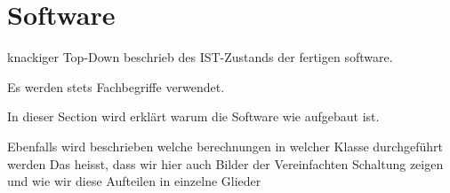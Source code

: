 \section{Software} \label{sec:software}

knackiger Top-Down beschrieb des IST-Zustands der fertigen software. 

Es werden stets Fachbegriffe verwendet. 


In dieser Section wird erklärt warum die Software wie aufgebaut ist.

Ebenfalls wird beschrieben welche berechnungen in welcher Klasse durchgeführt werden
Das heisst, dass wir hier auch Bilder der Vereinfachten Schaltung zeigen und wie wir diese Aufteilen in einzelne Glieder


